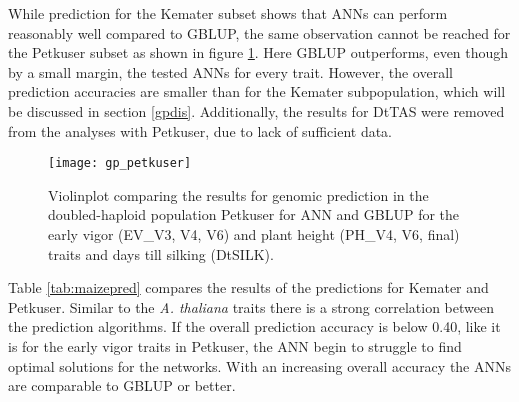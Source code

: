 While prediction for the Kemater subset shows that ANNs can perform reasonably well
compared to GBLUP, the same observation cannot be reached for the Petkuser subset as shown in
figure \ref{fig:pe_ann}. Here GBLUP outperforms, even though by a small margin, the tested
ANNs for every trait. However, the overall prediction accuracies are smaller than for the
Kemater subpopulation, which will be discussed in section \ref{gpdis}. Additionally, the
results for DtTAS were removed from the analyses with Petkuser, due to lack of sufficient
data.

\begin{figure}[H]
 \centering \texttt{[image: gp\_petkuser]}
 \decoRule
 \caption[Violinplot comparing the results for GP in the DH population Petkuser for ANN
 and GBLUP]{Violinplot comparing the results for genomic prediction in the doubled-haploid
   population Petkuser for ANN and GBLUP for the early vigor (EV\_V3, V4, V6) and plant height
   (PH\_V4, V6, final) traits and days till silking (DtSILK). }
\label{fig:pe_ann}
\end{figure}
          
Table \ref{tab:maizepred} compares the results of the predictions for Kemater and
Petkuser. Similar to the \textit{A. thaliana} traits there is a strong correlation between
the prediction algorithms. If  the overall prediction accuracy is below 0.40, like it is
for the early vigor traits in Petkuser, the ANN begin to struggle to find optimal
solutions for the networks. With an increasing overall accuracy the ANNs are comparable to
GBLUP or better.

